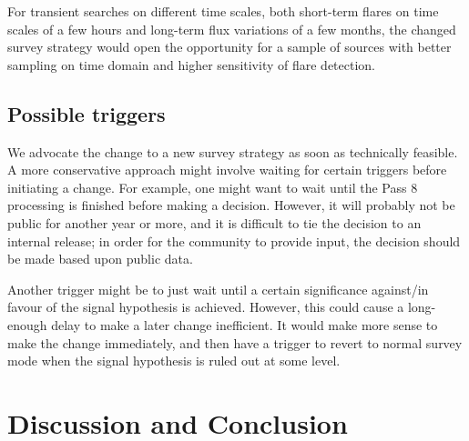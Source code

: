 \documentclass[aps,prd,superscriptaddress,nofootinbib,fixlfloat, 12pt]{revtex4-1}
\begin{document}
For transient searches on different time scales, both
short-term flares on time scales of a few hours and
long-term flux variations of a few months, the changed survey
strategy would open the opportunity for a sample of sources
with better sampling on time domain and higher sensitivity
of flare detection.


\subsection{Possible triggers}
We advocate the change to a new survey strategy as soon as technically
feasible. A more conservative approach might involve waiting for certain
triggers before initiating a change. For example, one might want to wait until
the Pass 8 processing is finished before making a decision.  However, it will
probably not be public for another year or more, and it is difficult to tie
the decision to an internal release; in order for the community to provide
input, the decision should be made based upon public data. 

Another trigger might be to just wait until a certain significance against/in
favour of the signal hypothesis is achieved. However, this could cause a
long-enough delay to make a later change inefficient. It would make more sense
to make the change immediately, and then have a trigger to revert to normal
survey mode when the signal hypothesis is ruled out at some level.


\section{Discussion and Conclusion}
\label{sec:Conclusion}
\end{document}
